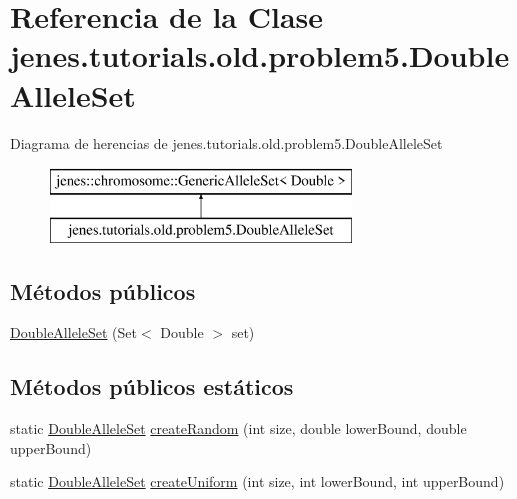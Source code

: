 \hypertarget{classjenes_1_1tutorials_1_1old_1_1problem5_1_1_double_allele_set}{\section{Referencia de la Clase jenes.\-tutorials.\-old.\-problem5.\-Double\-Allele\-Set}
\label{classjenes_1_1tutorials_1_1old_1_1problem5_1_1_double_allele_set}
}
Diagrama de herencias de jenes.\-tutorials.\-old.\-problem5.\-Double\-Allele\-Set\begin{figure}[H]
\begin{center}
\leavevmode
\includegraphics[height=2.000000cm]{classjenes_1_1tutorials_1_1old_1_1problem5_1_1_double_allele_set}
\end{center}
\end{figure}
\subsection*{Métodos públicos}
\begin{DoxyCompactItemize}
\item 
\hyperlink{classjenes_1_1tutorials_1_1old_1_1problem5_1_1_double_allele_set_a16cde300bda10dc1ce20aa354514ad55}{Double\-Allele\-Set} (Set$<$ Double $>$ set)
\end{DoxyCompactItemize}
\subsection*{Métodos públicos estáticos}
\begin{DoxyCompactItemize}
\item 
static \hyperlink{classjenes_1_1tutorials_1_1old_1_1problem5_1_1_double_allele_set}{Double\-Allele\-Set} \hyperlink{classjenes_1_1tutorials_1_1old_1_1problem5_1_1_double_allele_set_ab055f13f0aade5cd9bf21a42a6c00f67}{create\-Random} (int size, double lower\-Bound, double upper\-Bound)
\item 
static \hyperlink{classjenes_1_1tutorials_1_1old_1_1problem5_1_1_double_allele_set}{Double\-Allele\-Set} \hyperlink{classjenes_1_1tutorials_1_1old_1_1problem5_1_1_double_allele_set_af442b73be0657db17a35d7fb376a98ed}{create\-Uniform} (int size, int lower\-Bound, int upper\-Bound)
\end{DoxyCompactItemize}


